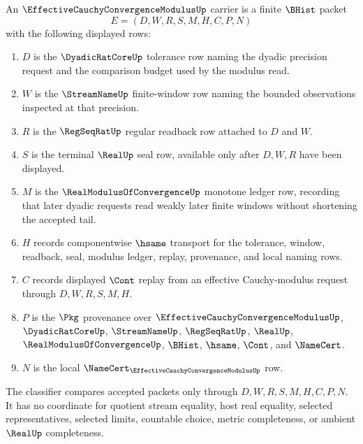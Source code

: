 \begin{definition}
\label{def:effective-cauchy-convergence-modulus-carrier}
An $\EffectiveCauchyConvergenceModulusUp$ carrier is a finite $\BHist$ packet
$$
E=(D,W,R,S,M,H,C,P,N)
$$
with the following displayed rows:
\begin{enumerate}
\item $D$ is the $\DyadicRatCoreUp$ tolerance row naming the dyadic precision request and the comparison budget used by the modulus read.
\item $W$ is the $\StreamNameUp$ finite-window row naming the bounded observations inspected at that precision.
\item $R$ is the $\RegSeqRatUp$ regular readback row attached to $D$ and $W$.
\item $S$ is the terminal $\RealUp$ seal row, available only after $D,W,R$ have been displayed.
\item $M$ is the $\RealModulusOfConvergenceUp$ monotone ledger row, recording that later dyadic requests read weakly later finite windows without shortening the accepted tail.
\item $H$ records componentwise $\hsame$ transport for the tolerance, window, readback, seal, modulus ledger, replay, provenance, and local naming rows.
\item $C$ records displayed $\Cont$ replay from an effective Cauchy-modulus request through $D,W,R,S,M,H$.
\item $P$ is the $\Pkg$ provenance over $\EffectiveCauchyConvergenceModulusUp$, $\DyadicRatCoreUp$, $\StreamNameUp$, $\RegSeqRatUp$, $\RealUp$, $\RealModulusOfConvergenceUp$, $\BHist$, $\hsame$, $\Cont$, and $\NameCert$.
\item $N$ is the local $\NameCert_{\EffectiveCauchyConvergenceModulusUp}$ row.
\end{enumerate}
The classifier compares accepted packets only through $D,W,R,S,M,H,C,P,N$. It has no coordinate for quotient stream equality, host real equality, selected representatives, selected limits, countable choice, metric completeness, or ambient $\RealUp$ completeness.
\end{definition}

